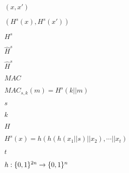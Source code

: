\documentclass[10pt]{book}
\begin{document}
\begin{mdSnippets}
\begin{mdInlineSnippet}[99848ea656282b4831c96a3b344dfc34]
$(x,x')$\end{mdInlineSnippet}%
\begin{mdInlineSnippet}[c749c4acf442f3828fd76403d39629f1]%
$(H^s(x), H^s(x'))$\end{mdInlineSnippet}%
\begin{mdInlineSnippet}%
$H^s$\end{mdInlineSnippet}%
\begin{mdInlineSnippet}%
$\hat{H}^s$\end{mdInlineSnippet}%
\begin{mdInlineSnippet}%
$\hat{H}^s$\end{mdInlineSnippet}%
\begin{mdInlineSnippet}[2e25c285356cbb0ed8785a1377027d79]%
$MAC$\end{mdInlineSnippet}%
\begin{mdInlineSnippet}[d3586b3b1e3dc0cabad7f24692708c95]%
$MAC_{s,k}(m) = H^s(k || m)$\end{mdInlineSnippet}%
\begin{mdInlineSnippet}[03c7c0ace395d80182db07ae2c30f034]%
$s$\end{mdInlineSnippet}%
\begin{mdInlineSnippet}[8ce4b16b22b58894aa86c421e8759df3]%
$k$\end{mdInlineSnippet}%
\begin{mdInlineSnippet}[c1d9f50f86825a1a2302ec2449c17196]%
$H$\end{mdInlineSnippet}%
\begin{mdInlineSnippet}[78293e78a8e722388c0a1d480c25ee71]%
$H^s(x) = h(h(h(x_1 || s) || x_2), \cdots || x_t)$\end{mdInlineSnippet}%
\begin{mdInlineSnippet}[e358efa489f58062f10dd7316b65649e]%
$t$\end{mdInlineSnippet}%
\begin{mdInlineSnippet}[79197b509f867a7322dbacecca1de4f2]%
$h: \{0,1\}^{2n} \to \{0,1\}^n$\end{mdInlineSnippet}%
\begin{mdInlineSnippet}[ad70146b431bea9ae74cf8385470c544]%

\end{mdInlineSnippet}
\end{mdSnippets}
\end{document}
